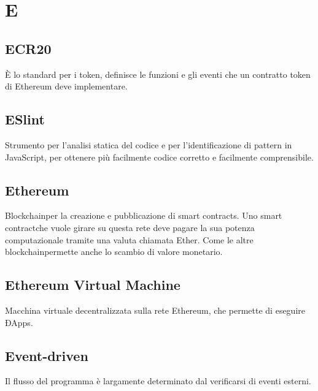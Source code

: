 \section*{E}
\subsection*{ECR20}
È lo standard per i token\glo, definisce le funzioni e gli eventi che un contratto token di Ethereum deve implementare.

\subsection*{ESlint}
Strumento per l’analisi statica del codice e per l’identificazione di pattern in JavaScript, per ottenere più facilmente codice corretto e facilmente comprensibile.

\subsection*{Ethereum}
Blockchain\glosp per la creazione e pubblicazione di smart contracts\glo. Uno smart contract\glosp che vuole girare su questa rete deve pagare la sua potenza computazionale tramite una valuta chiamata Ether. Come le altre blockchain\glosp permette anche lo scambio di valore monetario.

\subsection*{Ethereum Virtual Machine}
Macchina virtuale decentralizzata sulla rete Ethereum, che permette di eseguire ÐApps.

\subsection*{Event-driven}
Il flusso del programma è largamente determinato dal verificarsi di eventi esterni.

